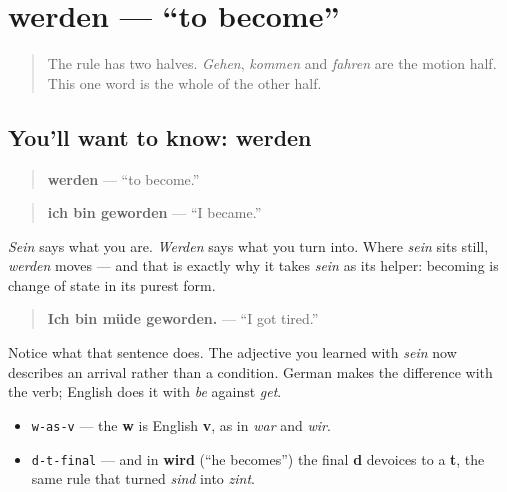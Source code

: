 \section[werden]{werden — \textquotedblleft{}to become\textquotedblright{}}

\label{lesson:GE-C16-werden}



\begin{quote}
The rule has two halves. \emph{Gehen}, \emph{kommen} and \emph{fahren} are the motion half. This one word is the whole of the other half.
\end{quote}

\subsection*{You'll want to know: werden}
\begin{quote}
\textbf{werden} — \textquotedblleft{}to become.\textquotedblright{}
\end{quote}

\begin{quote}
\textbf{ich bin geworden} — \textquotedblleft{}I became.\textquotedblright{}
\end{quote}

\emph{Sein} says what you are. \emph{Werden} says what you turn into. Where \emph{sein} sits still, \emph{werden} moves — and that is exactly why it takes \emph{sein} as its helper: becoming is change of state in its purest form.

\begin{quote}
\textbf{Ich bin müde geworden.} — \textquotedblleft{}I got tired.\textquotedblright{}
\end{quote}

Notice what that sentence does. The adjective you learned with \emph{sein} now describes an arrival rather than a condition. German makes the difference with the verb; English does it with \emph{be} against \emph{get}.

\begin{sounds}
\begin{itemize}
\raggedright
  \item \texttt{w-as-v} — the \textbf{w} is English \textbf{v}, as in \emph{war} and \emph{wir}.
  \item \texttt{d-t-final} — and in \textbf{wird} (\textquotedblleft{}he becomes\textquotedblright{}) the final \textbf{d} devoices to a \textbf{t}, the same rule that turned \emph{sind} into \emph{zint}.
\end{itemize}
\end{sounds}

